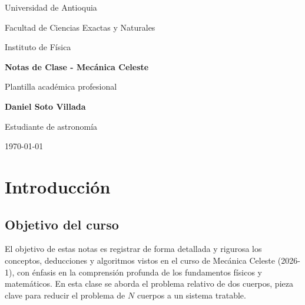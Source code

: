 \documentclass[12pt,oneside]{book}
\newcommand{\NombreEstudiante}{Daniel Soto Villada}
\newcommand{\Programa}{Estudiante de astronomía}
\newcommand{\Universidad}{Universidad de Antioquia}
\newcommand{\Facultad}{Facultad de Ciencias Exactas y Naturales}
\newcommand{\Instituto}{Instituto de Física}
\newcommand{\TituloDocumento}{Notas de Clase - Mecánica Celeste}
\begin{document}
\begin{titlepage}
    \centering
    \vspace*{1.8cm}

    {\Large\textcolor{grisSec}{\Universidad}\par}
    \vspace{0.25cm}
    {\large\textcolor{grisSec}{\Facultad}\par}
    {\large\textcolor{grisSec}{\Instituto}\par}

    \vspace{2.2cm}
    {\Huge\bfseries\textcolor{azulUdeA}{\TituloDocumento}\par}
    \vspace{0.5cm}
    {\Large\textcolor{grisSec}{Plantilla académica profesional}\par}

    \vspace{2.4cm}
    \begin{tcolorbox}[colback=grisClaro,colframe=azulUdeA,boxrule=0.9pt,arc=2mm,width=0.78\textwidth]
        \centering
        {\Large\bfseries \NombreEstudiante}\par
        \vspace{0.2cm}
        {\large \Programa}
    \end{tcolorbox}

    \vfill
    {\large\textcolor{grisSec}{\today}\par}
    \vspace{0.5cm}
\end{titlepage}

\frontmatter
\tableofcontents
\clearpage

\mainmatter

\chapter{Introducción}

\section{Objetivo del curso}
El objetivo de estas notas es registrar de forma detallada y rigurosa los conceptos, deducciones y algoritmos vistos en el curso de Mecánica Celeste (2026-1), con énfasis en la comprensión profunda de los fundamentos físicos y matemáticos. En esta clase se aborda el problema relativo de dos cuerpos, pieza clave para reducir el problema de \(N\) cuerpos a un sistema tratable.
\end{document}
